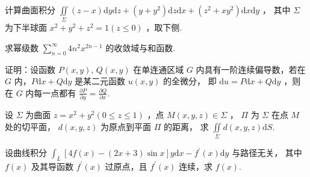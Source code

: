 \begin{problem}[points = 8]
计算曲面积分 $\iint\limits_\Sigma (z - x)\mathrm{d}y\mathrm{d}z + (y + y^2)\mathrm{d}z\mathrm{d}x + (z^2 + xy^2)\mathrm{d}x\mathrm{d}y$ ，
其中 $\Sigma$ 为下半球面 $x^2 + y^2 + z^2 = 1(z \leq 0)$ ，取下侧.
\end{problem}

\begin{problem}[points = 8]
求幂级数 $\sum\limits_{n = 0}^{\infty} 4n^2x^{2n - 1}$ 的收敛域与和函数.
\end{problem}

\begin{problem}[points = 5]
证明：设函数 $P(x, y),\, Q(x, y)$ 在单连通区域 $G$ 内具有一阶连续偏导数，若在 $G$ 内，$P\mathrm{d}x + Q\mathrm{d}y$ 是某二元函数 $u(x, y)$ 的全微分，
即 $\mathrm{d}u = P\mathrm{d}x + Q\mathrm{d}y$ ，则在 $G$ 内每一点都有 $\frac{\partial P}{\partial y} = \frac{\partial Q}{\partial x}$.
\end{problem}

\begin{problem}[points = 6]
设 $\Sigma$ 为曲面 $z = x^2 + y^2(0 \leq z \leq 1)$ ，点 $M(x, y, z) \in \Sigma$ ，
$\Pi$ 为 $\Sigma$ 在点 $M$ 处的切平面， $d(x, y, z)$ 为原点到平面 $\Pi$ 的距离，
求 $\iint\limits_\Sigma d(x, y, z)\mathrm{d}S$.
\end{problem}

\begin{problem}[points = 8]
设曲线积分 $\int_L [4f(x) - (2x + 3)\sin{x}]y\mathrm{d}x - f^{\prime}(x)\mathrm{d}y$ 与路径无关，
其中 $f(x)$ 及其导函数 $f^{\prime}(x)$ 过原点，且 $f^{\prime}(x)$ 连续，求 $f(x)$.
\end{problem}
